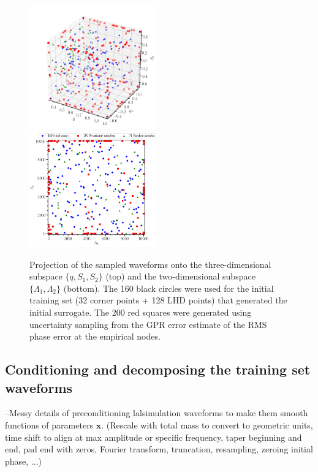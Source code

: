 \documentclass[prd,aps,letter,twocolumn,floatfix,notitlepage]{revtex4-1}
\begin{document}
\begin{figure}[htb]
\centering
\includegraphics[width=0.49\textwidth]{trainingset3d.png}\\
\includegraphics[width=0.49\textwidth]{trainingset2d.png}
\caption{Projection of the sampled waveforms onto the three-dimensional subspace $\{q, S_1, S_2\}$ (top)
and the two-dimensional subspace $\{\Lambda_1, \Lambda_2\}$ (bottom). The 160 black circles were used for the initial
training set (32 corner points + 128 LHD points) that generated the initial surrogate. The 200 red squares were generated
using uncertainty sampling from the GPR error estimate of the RMS phase error at the empirical nodes. 
}
\label{fig:LHD}
\end{figure}

\subsection{Conditioning and decomposing the training set waveforms}

--Messy details of preconditioning lalsimulation waveforms to make them smooth functions of parameters ${\bm x}$.
(Rescale with total mass to convert to geometric units, time shift to align at max amplitude or specific frequency, 
taper beginning and end, pad end with zeros, Fourier transform, truncation, resampling, zeroing initial phase, ...)
\end{document}
